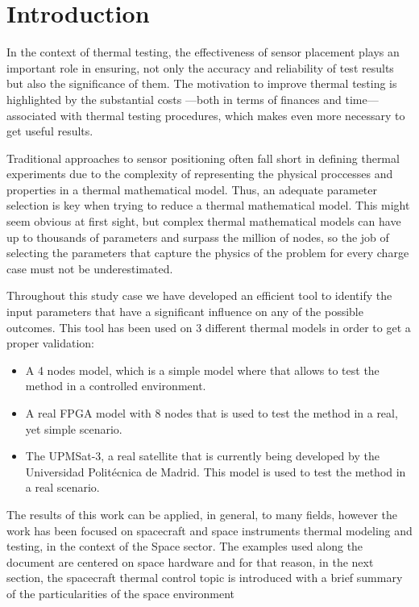 \chapter{Introduction} \label{ch:chapter_01}
In the context of thermal testing, the effectiveness of sensor placement plays an important role in ensuring, not only the accuracy and reliability of test results but also the significance of them. The motivation to improve thermal testing is highlighted by the substantial costs —both in terms of finances and time— associated with thermal testing procedures, which makes even more necessary to get useful results.

Traditional approaches to sensor positioning often fall short in defining thermal experiments due to the complexity of representing the physical proccesses and properties in a thermal mathematical model. Thus, an adequate parameter selection is key when trying to reduce a thermal mathematical model. This might seem obvious at first sight, but  complex thermal mathematical models can have up to thousands of parameters and surpass the million of nodes, so the job of selecting the parameters that capture the physics of the problem for every charge case must not be underestimated.

Throughout this study case we have developed an efficient tool to identify the input parameters that have a significant influence on any of the possible outcomes. This tool has been used on 3 different thermal models in order to get a proper validation:

\begin{itemize}
	\item A 4 nodes model, which is a simple model where  that allows to test the method in a controlled environment.
	\item A real FPGA model with 8 nodes that is used to test the method in a real, yet simple scenario.
	\item The UPMSat-3, a real satellite that is currently being developed by the Universidad Politécnica de Madrid. This model is used to test the method in a real scenario.

\end{itemize}

The results of this work can be applied, in general, to many fields, however the work has been focused on spacecraft and space instruments thermal modeling and testing, in the context of
the Space sector. The examples used along the document are centered on space hardware and for that reason, in the next section, the spacecraft thermal control topic is introduced
with a brief summary of the particularities of the space environment


